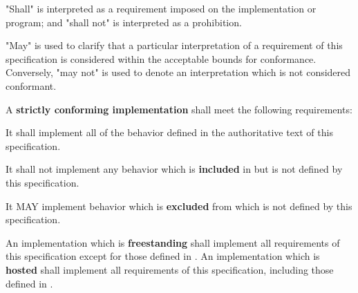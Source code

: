 
\specitem
"Shall" is interpreted as a requirement imposed on the implementation or
program; and "shall not" is interpreted as a prohibition.

\specitem
"May" is used to clarify that a particular interpretation of a requirement of
this specification is considered within the acceptable bounds for conformance.
Conversely, "may not" is used to denote an interpretation which is not
considered conformant.

\specitem
A \textbf{strictly conforming implementation} shall meet the following
requirements:

\specsubitem
It shall implement all of the behavior defined in the authoritative text of this
\\ specification.

\specsubitem
It shall not implement any behavior which is \textbf{included} in 
but is not defined by this specification.


\specsubitem
It MAY implement behavior which is \textbf{excluded} from  which
is not defined by this specification.

\specitem
An implementation which is \textbf{freestanding} shall implement all
requirements of this specification except for those defined in . An implementation which is \textbf{hosted} shall implement all
requirements of this specification, including those defined in
.

